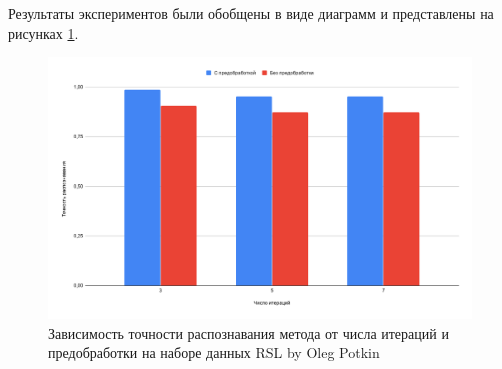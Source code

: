 Результаты экспериментов были обобщены в виде диаграмм и представлены на рисунках \ref{res:rsl_oleg}.

\begin{figure}
	\centering
	\includegraphics[width=\textwidth]{inc/img/rsl_oleg}
	\caption{Зависимость точности распознавания метода от числа итераций и предобработки на наборе данных RSL by Oleg Potkin}
	\label{res:rsl_oleg}
\end{figure}